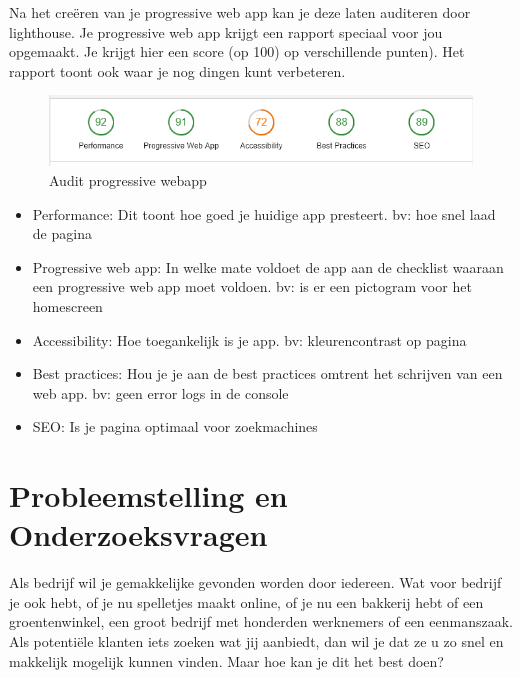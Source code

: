 Na het creëren van je progressive web app kan je deze laten auditeren door lighthouse. Je progressive web app krijgt een rapport speciaal voor jou opgemaakt. Je krijgt hier een score (op 100) op verschillende punten). Het rapport toont ook waar je nog dingen kunt verbeteren.
\begin{figure}[h]
	\includegraphics[scale=1]{img/audit.png}
	\caption{Audit progressive webapp}
	\label{fig:audit}
\end{figure}

\begin{itemize}  
	\item Performance: Dit toont hoe goed je huidige app presteert. bv: hoe snel laad de pagina
	\item Progressive web app: In welke mate voldoet de app aan de checklist waaraan een progressive web app moet voldoen. bv: is er een pictogram voor het homescreen
	\item Accessibility: Hoe toegankelijk is je app. bv: kleurencontrast op pagina
	\item Best practices: Hou je je aan de best practices omtrent het schrijven van een web app. bv: geen error logs in de console
	\item SEO: Is je pagina optimaal voor zoekmachines
\end{itemize}



\section{Probleemstelling en Onderzoeksvragen}
\label{sec:onderzoeksvragen}


Als bedrijf wil je gemakkelijke gevonden worden door iedereen. Wat voor bedrijf je ook hebt, of je nu spelletjes maakt online, of je nu een bakkerij hebt of een groentenwinkel, een groot bedrijf met honderden werknemers of een eenmanszaak. Als potentiële klanten iets zoeken wat jij aanbiedt, dan wil je dat ze u zo snel en makkelijk mogelijk kunnen vinden. Maar hoe kan je dit het best doen? 


